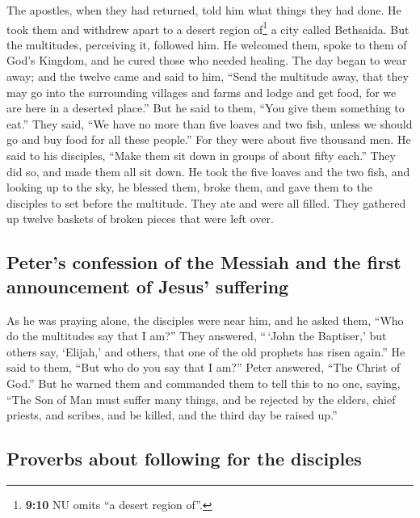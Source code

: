  The apostles, when they had returned, told him what
things they had done. He took them and withdrew apart to a desert region
of\footnote{\textbf{9:10} NU omits ``a desert region of''.} a city
called Bethsaida.  But the multitudes, perceiving it,
followed him. He welcomed them, spoke to them of God's Kingdom, and he
cured those who needed healing.  The day began to wear
away; and the twelve came and said to him, ``Send the multitude away,
that they may go into the surrounding villages and farms and lodge and
get food, for we are here in a deserted place.''  But he
said to them, ``You give them something to eat.'' They said, ``We have
no more than five loaves and two fish, unless we should go and buy food
for all these people.''  For they were about five
thousand men. He said to his disciples, ``Make them sit down in groups
of about fifty each.''  They did so, and made them all
sit down.  He took the five loaves and the two fish, and
looking up to the sky, he blessed them, broke them, and gave them to the
disciples to set before the multitude.  They ate and were
all filled. They gathered up twelve baskets of broken pieces that were
left over.

\hypertarget{peters-confession-of-the-messiah-and-the-first-announcement-of-jesus-suffering}{%
\subsection{Peter's confession of the Messiah and the first announcement
of Jesus'
suffering}\label{peters-confession-of-the-messiah-and-the-first-announcement-of-jesus-suffering}}

 As he was praying alone, the disciples were near him,
and he asked them, ``Who do the multitudes say that I am?''
 They answered, ``\,`John the Baptiser,' but others say,
`Elijah,' and others, that one of the old prophets has risen again.''
 He said to them, ``But who do you say that I am?'' Peter
answered, ``The Christ of God.''  But he warned them and
commanded them to tell this to no one,  saying, ``The Son
of Man must suffer many things, and be rejected by the elders, chief
priests, and scribes, and be killed, and the third day be raised up.''

\hypertarget{proverbs-about-following-for-the-disciples}{%
\subsection{Proverbs about following for the
disciples}\label{proverbs-about-following-for-the-disciples}}

